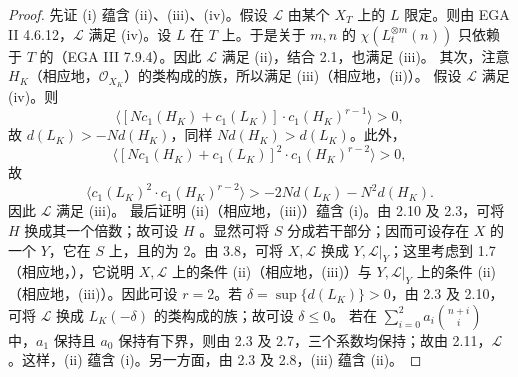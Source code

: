\begin{proof}
先证 (i) 蕴含 (ii)、(iii)、(iv)。假设 $\mathscr L$ 由某个 $X_T$ 上的 $L$ 限定。则由 EGA II 4.6.12，$\mathscr L$ 满足 (iv)。设 $L$ 在 $T$ 上。于是关于 $m,n$ 的 $\chi(L_t^{\otimes m}(n))$ 只依赖于 $T$ 的（EGA III 7.9.4）。因此 $\mathscr L$ 满足 (ii)，结合 2.1，也满足 (iii)。
其次，注意 $H_K$（相应地，$\mathcal O_{X_K}$）的类构成的族，所以满足 (iii)（相应地，(ii)）。
假设 $\mathscr L$ 满足 (iv)。则
\[\langle[Nc_1(H_K)+c_1(L_K)]\cdot c_1(H_K)^{r-1}\rangle>0,\]
故 $d(L_K)>-Nd(H_K)$，同样 $Nd(H_K)>d(L_K)$。此外，
\[\langle[Nc_1(H_K)+c_1(L_K)]^2\cdot c_1(H_K)^{r-2}\rangle>0,\]
故
\[\langle c_1(L_K)^2\cdot c_1(H_K)^{r-2}\rangle>-2Nd(L_K)-N^2d(H_K).\]
因此 $\mathscr L$ 满足 (iii)。
最后证明 (ii)（相应地，(iii)）蕴含 (i)。由 2.10 及 2.3，可将 $H$ 换成其一个倍数；故可设 $H$ 。显然可将 $S$ 分成若干部分；因而可设存在 $X$ 的一个 $Y$，它在 $S$ 上，且的为 $2$。由 3.8，可将 $X,\mathscr L$ 换成 $Y,\mathscr L|_Y$；这里考虑到 1.7（相应地，），它说明 $X,\mathscr L$ 上的条件 (ii)（相应地，(iii)）与 $Y,\mathscr L|_Y$ 上的条件 (ii)（相应地，(iii)）。因此可设 $r=2$。若 $\delta=\sup\{d(L_K)\}>0$，由 2.3 及 2.10，可将 $\mathscr L$ 换成 $L_K(-\delta)$ 的类构成的族；故可设 $\delta\leq0$。
若在 $\sum_{i=0}^2 a_i\binom{n+i}{i}$ 中，$a_1$ 保持且 $a_0$ 保持有下界，则由 2.3 及 2.7，三个系数均保持；故由 2.11，$\mathscr L$ 。这样，(ii) 蕴含
(i)。另一方面，由 2.3 及 2.8，(iii) 蕴含 (ii)。
\end{proof}
